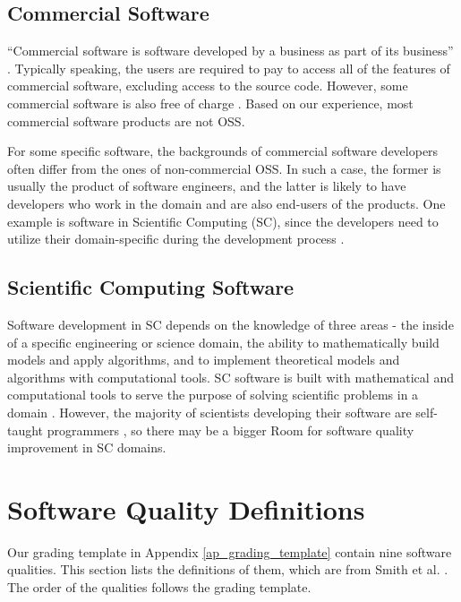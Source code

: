 \subsection{Commercial Software}
``Commercial software is software developed by a business as part of its business'' \cite{GNU2019}.
Typically speaking, the users are required to pay to access all of the features of commercial software, excluding access to the source code. However, some commercial software is also free of charge \cite{GNU2019}. Based on our experience, most commercial software products are not OSS.

For some specific software, the backgrounds of commercial software developers often differ from the ones of non-commercial OSS. In such a case, the former is usually the product of software engineers, and the latter is likely to have developers who work in the domain and are also end-users of the products. One example is software in Scientific Computing (SC), since the developers need to utilize their domain-specific during the development process \cite{WilsonEtAl2014}.

\subsection{Scientific Computing Software}
Software development in SC depends on the knowledge of three areas - the inside of a specific engineering or science domain, the ability to mathematically build models and apply algorithms, and to implement theoretical models and algorithms with computational tools. SC software is built with mathematical and computational tools to serve the purpose of solving scientific problems in a domain \cite{Mehta2015}. However, the majority of scientists developing their software are self-taught programmers \cite{WilsonEtAl2014}, so there may be a bigger Room for software quality improvement in SC domains.

\section{Software Quality Definitions}
\label{sec_software_quality}

Our grading template in Appendix \ref{ap_grading_template} contain nine software qualities. This section lists the definitions of them, which are from Smith et al. \cite{SmithEtAl2020}. The order of the qualities follows the grading template.

